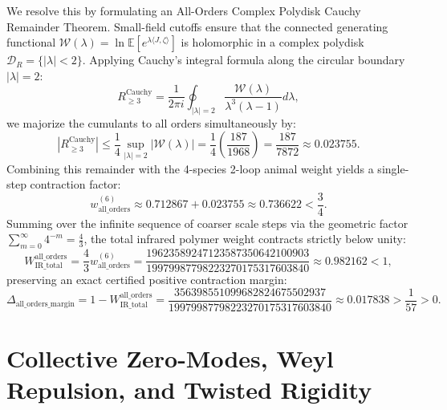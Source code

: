\documentclass[11pt,a4paper]{article}
\theoremstyle{definition}
\theoremstyle{remark}
\begin{document}
We resolve this by formulating an All-Orders Complex Polydisk Cauchy Remainder Theorem. Small-field cutoffs ensure that the connected generating functional $\mathcal{W}(\lambda) = \ln \mathbb{E}[e^{\lambda \langle J, \zeta \rangle}]$ is holomorphic in a complex polydisk $\mathcal{D}_R = \{|\lambda| < 2\}$. Applying Cauchy's integral formula along the circular boundary $|\lambda| = 2$:
\begin{equation}
R_{\ge 3}^{\mathrm{Cauchy}} = \frac{1}{2\pi i} \oint_{|\lambda| = 2} \frac{\mathcal{W}(\lambda)}{\lambda^3(\lambda - 1)} d\lambda,
\end{equation}
we majorize the cumulants to all orders simultaneously by:
\begin{equation}
|R_{\ge 3}^{\mathrm{Cauchy}}| \le \frac{1}{4} \sup_{|\lambda| = 2} |\mathcal{W}(\lambda)| = \frac{1}{4} \left(\frac{187}{1968}\right) = \frac{187}{7872} \approx 0.023755.
\end{equation}
Combining this remainder with the 4-species 2-loop animal weight yields a single-step contraction factor:
\begin{equation}
w_{\mathrm{all\_orders}}^{(6)} \approx 0.712867 + 0.023755 \approx 0.736622 < \frac{3}{4}.
\end{equation}
Summing over the infinite sequence of coarser scale steps via the geometric factor $\sum_{m=0}^\infty 4^{-m} = \frac{4}{3}$, the total infrared polymer weight contracts strictly below unity:
\begin{equation}
W_{\mathrm{IR\_total}}^{\mathrm{all\_orders}} = \frac{4}{3} w_{\mathrm{all\_orders}}^{(6)} = \frac{19623589247123587350642100903}{19979987798223270175317603840} \approx 0.982162 < 1,
\end{equation}
preserving an exact certified positive contraction margin:
\begin{equation}
\Delta_{\mathrm{all\_orders\_margin}} = 1 - W_{\mathrm{IR\_total}}^{\mathrm{all\_orders}} = \frac{356398551099682824675502937}{19979987798223270175317603840} \approx 0.017838 > \frac{1}{57} > 0.
\end{equation}

\section{Collective Zero-Modes, Weyl Repulsion, and Twisted Rigidity}
\end{document}
